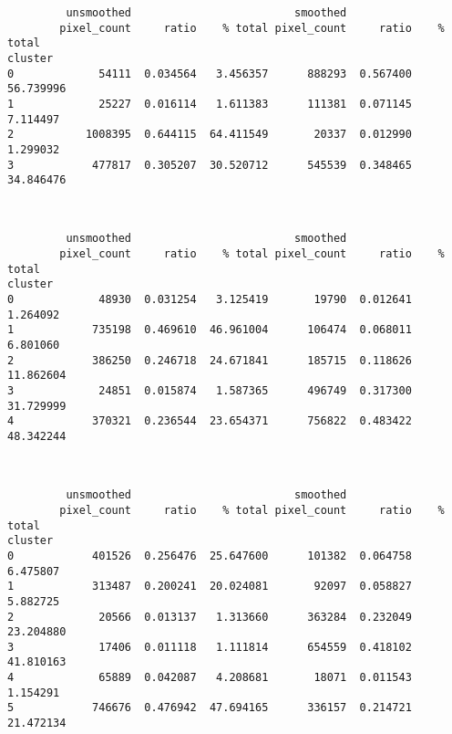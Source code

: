 \documentclass[11pt]{article}
\begin{document}
    
    \begin{verbatim}
         unsmoothed                         smoothed                     
        pixel_count     ratio    % total pixel_count     ratio    % total
cluster                                                                  
0             54111  0.034564   3.456357      888293  0.567400  56.739996
1             25227  0.016114   1.611383      111381  0.071145   7.114497
2           1008395  0.644115  64.411549       20337  0.012990   1.299032
3            477817  0.305207  30.520712      545539  0.348465  34.846476
    \end{verbatim}

    
    \begin{center}
    \end{center}
    { \hspace*{\fill} \\}
    
    
    \begin{verbatim}
         unsmoothed                         smoothed                     
        pixel_count     ratio    % total pixel_count     ratio    % total
cluster                                                                  
0             48930  0.031254   3.125419       19790  0.012641   1.264092
1            735198  0.469610  46.961004      106474  0.068011   6.801060
2            386250  0.246718  24.671841      185715  0.118626  11.862604
3             24851  0.015874   1.587365      496749  0.317300  31.729999
4            370321  0.236544  23.654371      756822  0.483422  48.342244
    \end{verbatim}

    
    \begin{center}
    \end{center}
    { \hspace*{\fill} \\}
    
    
    \begin{verbatim}
         unsmoothed                         smoothed                     
        pixel_count     ratio    % total pixel_count     ratio    % total
cluster                                                                  
0            401526  0.256476  25.647600      101382  0.064758   6.475807
1            313487  0.200241  20.024081       92097  0.058827   5.882725
2             20566  0.013137   1.313660      363284  0.232049  23.204880
3             17406  0.011118   1.111814      654559  0.418102  41.810163
4             65889  0.042087   4.208681       18071  0.011543   1.154291
5            746676  0.476942  47.694165      336157  0.214721  21.472134
    \end{verbatim}
\end{document}
